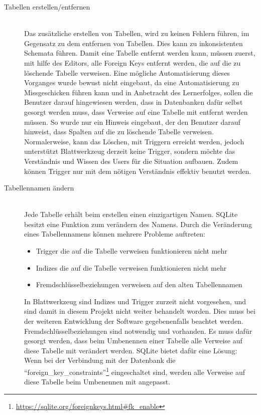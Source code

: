 \begin{description}
\item[Tabellen erstellen/entfernen] \hfill\\
Das zusätzliche erstellen von Tabellen, wird zu keinen Fehlern führen, im Gegensatz zu dem entfernen von Tabellen. Dies kann zu inkonsistenten Schemata führen. Damit eine Tabelle entfernt werden kann, müssen zuerst, mit hilfe des Editors, alle Foreign Keys entfernt werden, die auf die zu löschende Tabelle verweisen. Eine mögliche Automatisierung dieses Vorganges wurde bewust nicht eingebaut, da eine Automatisierung zu Missgeschicken führen kann und in Anbetracht des Lernerfolges, sollen die Benutzer darauf hingewiesen werden, dass in Datenbanken dafür selbst gesorgt werden muss, dass Verweise auf eine Tabelle mit entfernt werden müssen. So wurde nur ein Hinweis eingebaut, der den Benutzer darauf hinweist, dass Spalten auf die zu löschende Tabelle verweisen. Normalerweise, kann das Löschen, mit Triggern erreicht werden, jedoch unterstützt Blattwerkzeug derzeit keine Trigger, sondern möchte das Verständnis und Wissen des Users für die Situation aufbauen. Zudem können Trigger nur mit dem nötigen Verständnis effektiv benutzt werden. 

\item[Tabellennamen ändern] \hfill\\
Jede Tabelle erhält beim erstellen einen einzigartigen Namen. SQLite besitzt eine Funktion zum verändern des Namens.
Durch die Veränderung eines Tabellennamens können mehrere Probleme auftreten:
\begin{itemize}
    \item Trigger die auf die Tabelle verweisen funktionieren nicht mehr
    \item Indizes die auf die Tabelle verweisen funktionieren nicht mehr
    \item Fremdschlüsselbeziehungen verweisen auf den alten Tabellennamen
\end{itemize}
In Blattwerkzeug sind Indizes und Trigger zurzeit nicht vorgesehen, und sind damit in diesem Projekt nicht weiter behandelt worden. Dies muss bei der weiteren Entwicklung der Software gegebenenfalls beachtet werden.
Fremdschlüsselbeziehungen sind notwendig und vorhanden. Es muss dafür gesorgt werden, dass beim Umbenennen einer Tabelle alle Verweise auf diese Tabelle mit verändert werden. SQLite bietet dafür eine Lösung: \\
Wenn bei der Verbindung mit der Datenbank die ``foreign\_key\_constraints''\footnote{\url{https://sqlite.org/foreignkeys.html\#fk_enable}} eingeschaltet sind, werden alle Verweise auf diese Tabelle beim Umbenennen mit angepasst.\cite{sqlite_doc_alter}


\end{description}
